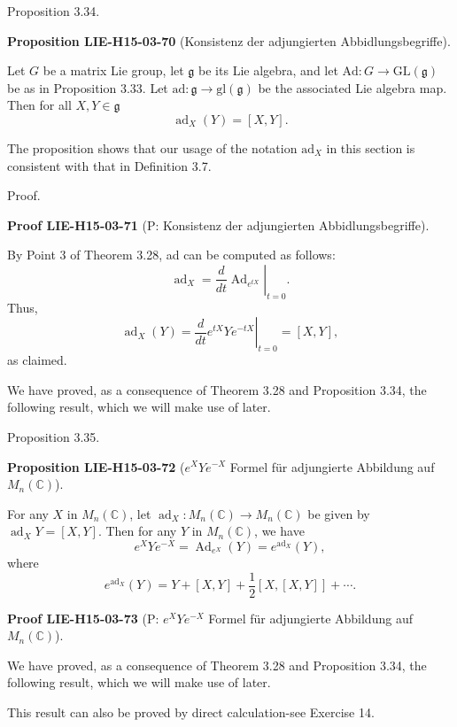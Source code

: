 \documentclass[10pt, letterpaper]{article}
\newcommand{\C}{\mathbb{C}}
\newcommand{\CustomHeading}[3]{%
  \par\medskip\noindent%
  \textbf{#1 #2} \textnormal{(#3)}.\enskip%
}
\newenvironment{PROP}[2]{\begin{unitbox}\CustomHeading{Proposition}{#1}{#2}}{\end{unitbox}}
\newenvironment{PROOF}[2]{\begin{unitbox}\CustomHeading{Proof}{#1}{#2}}{\end{unitbox}}
\begin{document}
Proposition 3.34. 


\begin{PROP}{LIE-H15-03-70}{Konsistenz der adjungierten Abbidlungsbegriffe}
Let $G$ be a matrix Lie group, let $\mathfrak{g}$ be its Lie algebra, and let $\mathrm{Ad}: G \rightarrow \mathrm{GL}(\mathfrak{g})$ be as in Proposition 3.33. Let $\mathrm{ad}: \mathfrak{g} \rightarrow \mathrm{gl}(\mathfrak{g})$ be the associated Lie algebra map. Then for all $X, Y \in \mathfrak{g}$
$$
\operatorname{ad}_{X}(Y)=[X, Y] .
$$
\end{PROP}


The proposition shows that our usage of the notation $\mathrm{ad}_{X}$ in this section is consistent with that in Definition 3.7.

Proof. 

\begin{PROOF}{LIE-H15-03-71}{P: Konsistenz der adjungierten Abbidlungsbegriffe}
By Point 3 of Theorem 3.28, ad can be computed as follows:
$$
\operatorname{ad}_{X}=\left.\frac{d}{d t} \operatorname{Ad}_{e^{t X}}\right|_{t=0} .
$$
Thus,
$$
\operatorname{ad}_{X}(Y)=\left.\frac{d}{d t} e^{t X} Y e^{-t X}\right|_{t=0}=[X, Y],
$$
as claimed.
\end{PROOF}


We have proved, as a consequence of Theorem 3.28 and Proposition 3.34, the following result, which we will make use of later.

Proposition 3.35. 


\begin{PROP}{LIE-H15-03-72}{$e^XYe^{-X}$ Formel für adjungierte Abbildung auf $M_n(\C)$}
For any $X$ in $M_{n}(\mathbb{C})$, let $\operatorname{ad}_{X}: M_{n}(\mathbb{C}) \rightarrow M_{n}(\mathbb{C})$ be given by $\operatorname{ad}_{X} Y=[X, Y]$. Then for any $Y$ in $M_{n}(\mathbb{C})$, we have
$$
e^{X} Y e^{-X}=\operatorname{Ad}_{e^{X}}(Y)=e^{\operatorname{ad}_{X}}(Y),
$$
where
$$
e^{\operatorname{ad}_{X}}(Y)=Y+[X, Y]+\frac{1}{2}[X,[X, Y]]+\cdots .
$$
\end{PROP}

\begin{PROOF}{LIE-H15-03-73}{P: $e^XYe^{-X}$ Formel für adjungierte Abbildung auf $M_n(\C)$}
We have proved, as a consequence of Theorem 3.28 and Proposition 3.34, the following result, which we will make use of later.

This result can also be proved by direct calculation-see Exercise 14.
\end{PROOF}
\end{document}
